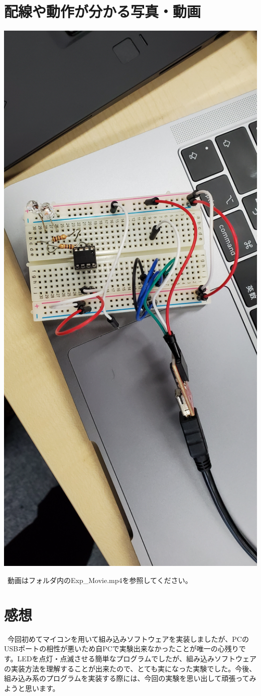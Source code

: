 \documentclass[titlepage]{ujarticle}
\begin{document}
\section{配線や動作が分かる写真・動画} 
	\includegraphics[width=16cm]{1.jpg} \par
	\vspace{\baselineskip}
	\ 動画はフォルダ内のExp\_Movie.mp4を参照してください。 \par
\newpage
\section{感想}
	\ 今回初めてマイコンを用いて組み込みソフトウェアを実装しましたが、PCのUSBポートの相性が悪いため自PCで実験出来なかったことが唯一の心残りです。LEDを点灯・点滅させる簡単なプログラムでしたが、組み込みソフトウェアの実装方法を理解することが出来たので、とても実になった実験でした。今後、組み込み系のプログラムを実装する際には、今回の実験を思い出して頑張ってみようと思います。
\end{document}
